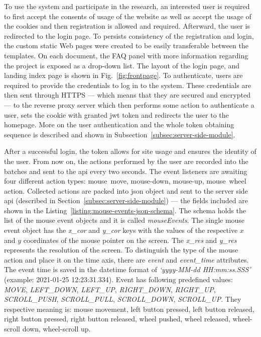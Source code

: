 To use the system and participate in the research, an interested user is required to first accept the consents of usage of the website as well as accept the usage of the cookies and then registration is allowed and required. Afterward, the user is redirected to the login page.
To persists consistency of the registration and login, the custom static Web pages were created to be easily transferable between the templates.
On each document, the FAQ panel with more information regarding the project is exposed as a drop-down list.
The layout of the login page, and landing index page is shown in Fig.~\ref{fig:frontpage}.
To authenticate, users are required to provide the credentials to log in to the system.
These credentials are then sent through HTTPS --- which means that they are secured and encrypted --- to the reverse proxy server which then performs some action to authenticate a user, sets the cookie with granted \gls{jwt} token and redirects the user to the homepage.
More on the user authentication and the whole token obtaining sequence is described and shown in Subsection~\ref{subsec:server-side-module}.

After a successful login, the token allows for site usage and ensures the identity of the user.
From now on, the actions performed by the user are recorded into the batches and sent to the \gls{api} every two seconds.
The event listeners are awaiting four different action types: \mbox{mouse move}, \mbox{mouse-down}, \mbox{mouse-up}, \mbox{mouse wheel} action.
Collected actions are packed into \gls{json} object and sent to the server side \gls{api} (described in Section~\ref{subsec:server-side-module}) --- the fields included are shown in the Listing~\ref{listing:mouse-events-json-schema}.
The schema holds the list of the mouse event objects and it is called \textit{mouseEvents}.
The single mouse event object has the \textit{x\_cor} and \textit{y\_cor} keys with the values of the respective $x$ and $y$ coordinates of the mouse pointer on the screen.
The \textit{x\_res} and \textit{y\_res} represents the resolution of the screen.
To distinguish the type of the mouse action and place it on the time axis, there are \textit{event} and \textit{event\_time} attributes.
The event time is saved in the datetime format of \textit{`yyyy-MM-dd HH:mm:ss.SSS'} (example: 2021-01-25 12:23:31.334).
Event has following predefined values: \textit{MOVE}, \textit{LEFT\_DOWN}, \textit{LEFT\_UP}, \textit{RIGHT\_DOWN}, \textit{RIGHT\_UP}, \textit{SCROLL\_PUSH}, \textit{SCROLL\_PULL}, \textit{SCROLL\_DOWN}, \textit{SCROLL\_UP}\@.
They respective meaning is: mouse movement, left button pressed, left button released, right button pressed, right button released, wheel pushed, wheel released, wheel-scroll down, wheel-scroll up.



